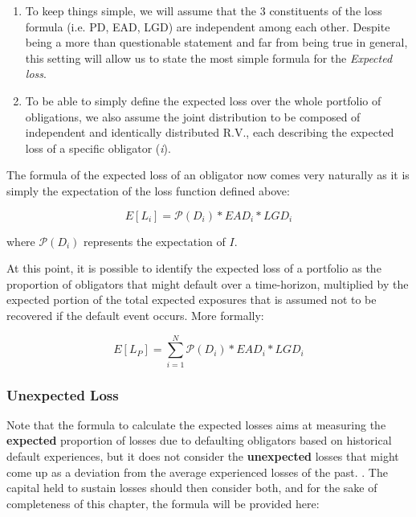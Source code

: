 \documentclass[a4paper,12pt]{article}
\begin{document}
    \begin{enumerate}
        \item To keep things simple, we will assume that the 3 constituents of the loss formula (i.e. PD, EAD, LGD) are independent among each other. Despite being a more than questionable statement and far from being true in general, this setting will allow us to state the most simple formula for the \textit{Expected loss}.
        \item To be able to simply define the expected loss over the whole portfolio of obligations, we also assume the joint distribution to be composed of independent and identically distributed R.V., each describing the expected loss of a specific obligator (\textit{i}).
    \end{enumerate}

    The formula of the expected loss of an obligator now comes very naturally as it is simply the expectation of the loss function defined above:

        \begin{equation}
            E[L_{i}]=\mathcal{P}(D_{i})*EAD_{i}*LGD_{i}
        \end{equation}
    
    where $\mathcal{P}(D_{i})$ represents the expectation of $I$.

    At this point, it is possible to identify the expected loss of a portfolio as the proportion of obligators that might default over a time-horizon,
    multiplied by the expected portion of the total expected exposures that is assumed not to be recovered if the default event occurs. More formally:

        \begin{equation}
            E[L_{P}]=\sum_{i=1}^{N} \mathcal{P}(D_{i})*EAD_{i}*LGD_{i}
        \end{equation}

    \subsubsection{Unexpected Loss}
    Note that the formula to calculate the expected losses aims at measuring the \textbf{expected} 
    proportion of losses due to defaulting obligators based on historical default experiences, 
    but it does not consider the \textbf{unexpected} losses that might come up as a deviation 
    from the average experienced losses of the past. \cite{bluhm2016introduction}. 
    The capital held to sustain losses should then consider both, and for the sake of completeness of this chapter, 
    the formula will be provided here:
\end{document}
